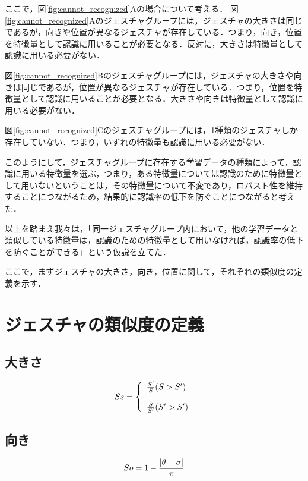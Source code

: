 ここで，図\ref{fig:cannot_recognized}Aの場合について考える．
図\ref{fig:cannot_recognized}Aのジェスチャグループには，ジェスチャの大きさは同じであるが，向きや位置が異なるジェスチャが存在している．つまり，向き，位置を特徴量として認識に用いることが必要となる．反対に，大きさは特徴量として認識に用いる必要がない．

図\ref{fig:cannot_recognized}Bのジェスチャグループには，ジェスチャの大きさや向きは同じであるが，位置が異なるジェスチャが存在している．つまり，位置を特徴量として認識に用いることが必要となる．大きさや向きは特徴量として認識に用いる必要がない．

図\ref{fig:cannot_recognized}Cのジェスチャグループには，1種類のジェスチャしか存在していない．つまり，いずれの特徴量も認識に用いる必要がない．

このようにして，ジェスチャグループに存在する学習データの種類によって，認識に用いる特徴量を選ぶ，つまり，ある特徴量については認識のために特徴量として用いないということは，その特徴量について不変であり，ロバスト性を維持することにつながるため，結果的に認識率の低下を防ぐことにつながると考えた．

以上を踏まえ我々は，「同一ジェスチャグループ内において，他の学習データと類似している特徴量は，認識のための特徴量として用いなければ，認識率の低下を防ぐことができる」という仮説を立てた．

ここで，まずジェスチャの大きさ，向き，位置に関して，それぞれの類似度の定義を示す．

\section{ジェスチャの類似度の定義}

\subsection{大きさ}
\begin{equation}
S{\scriptsize s} = \left \{
\begin{array}{l}
\frac{S'}{S} (S>S') \\\\
\frac{S}{S'} (S'>S')
\end{array}
\right.
\end{equation}


\subsection{向き}
\begin{equation}
S{\scriptsize o} = 1 - \frac{|\theta - \sigma|}{\pi}
\end{equation}

